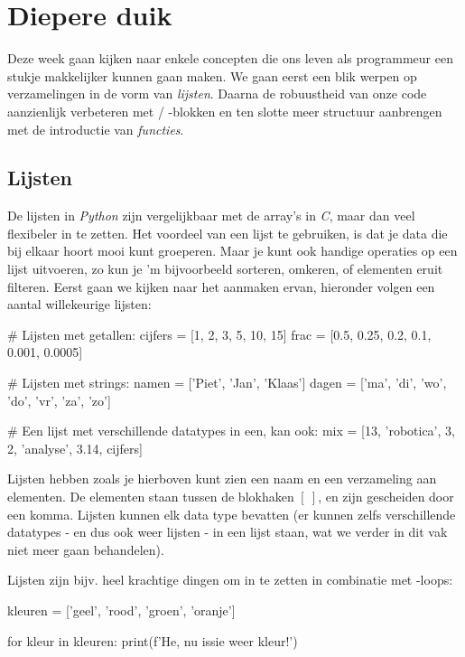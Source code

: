 \chapter{Diepere duik}
Deze week gaan kijken naar enkele concepten die ons leven als programmeur een stukje makkelijker kunnen gaan maken. We gaan eerst een blik werpen op verzamelingen in de vorm van \textit{lijsten}. Daarna de robuustheid van onze code aanzienlijk verbeteren met  / -blokken en ten slotte meer structuur aanbrengen met de introductie van \textit{functies}. 

\section{Lijsten}
De lijsten in \textit{Python} zijn vergelijkbaar met de array's in \textit{C}, maar dan veel flexibeler in te zetten. Het voordeel van een lijst te gebruiken, is dat je data die bij elkaar hoort mooi kunt groeperen. Maar je kunt ook handige operaties op een lijst uitvoeren, zo kun je 'm bijvoorbeeld sorteren, omkeren, of elementen eruit filteren. Eerst gaan we kijken naar het aanmaken ervan, hieronder volgen een aantal willekeurige lijsten:

\begin{python}
# Lijsten met getallen:
cijfers = [1, 2, 3, 5, 10, 15] 
frac = [0.5, 0.25, 0.2, 0.1, 0.001, 0.0005] 

# Lijsten met strings:
namen = ['Piet', 'Jan', 'Klaas']
dagen = ['ma', 'di', 'wo', 'do', 'vr', 'za', 'zo']

# Een lijst met verschillende datatypes in een, kan ook:
mix = [13, 'robotica', 3, 2, 'analyse', 3.14, cijfers]
\end{python}

Lijsten hebben zoals je hierboven kunt zien een naam en een verzameling aan elementen. De elementen staan tussen de blokhaken $[\ ]$, en zijn gescheiden door een komma. Lijsten kunnen elk data type bevatten (er kunnen zelfs verschillende datatypes - en dus ook weer lijsten - in een lijst staan, wat we verder in dit vak niet meer gaan behandelen).

\newpage

Lijsten zijn bijv. heel krachtige dingen om in te zetten in combinatie met -loops:
\begin{python}
kleuren = ['geel', 'rood', 'groen', 'oranje']

for kleur in kleuren:
	print(f'He, nu issie weer {kleur}!')
\end{python}

